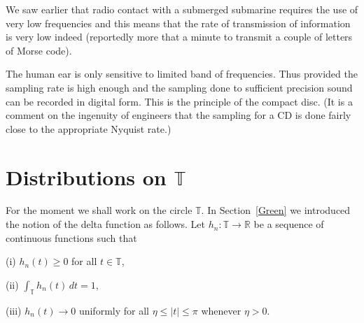 \documentclass[12pt]{article}
\theoremstyle{definition}
\begin{document}
We saw earlier that radio contact with a submerged submarine
requires the use of very low frequencies and this means that
the rate of transmission of information is very low indeed
(reportedly more that a minute to transmit a couple
of letters of Morse code). 

The human ear is only sensitive to limited band of frequencies.
Thus provided the sampling rate is high enough and the sampling done
to sufficient precision sound can be recorded in digital form.
This is the principle of the compact disc. (It is a comment
on the ingenuity of engineers that the sampling for a CD
is done fairly close to the appropriate Nyquist rate.)

\section{Distributions on ${\mathbb T}$} 
For the moment we shall work
on  the circle ${\mathbb T}$.  In Section~\ref{Green}
we introduced the notion of the delta function as
follows. Let $h_{n}:{\mathbb T}\rightarrow{\mathbb R}$
be a sequence of continuous functions such that

(i) $h_{n}(t)\geq 0$ for all $t\in{\mathbb T}$,

(ii) ${\displaystyle \int_{\mathbb T}h_{n}(t)\,dt=1}$,

(iii) $h_{n}(t)\rightarrow 0$ uniformly for all $\eta\leq |t|\leq \pi$
whenever $\eta>0$.
\end{document}
